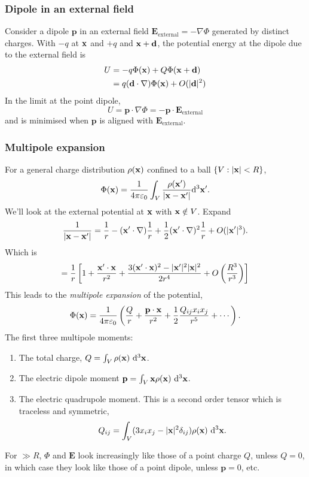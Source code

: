 \documentclass{article}
\begin{document}
\subsubsection{Dipole in an external field}
Consider a dipole $ \mathbf p $ in an external field $ \mathbf E_{\text{external}} = - \nabla\Phi $ generated by distinct charges. With $ -q $ at $ \mathbf{x} $ and $ +q $ and $ \mathbf{x}+\mathbf d $, the potential energy at the dipole due to the external field is
\begin{align*}
	U &= -q\Phi(\mathbf{x}) +Q \Phi(\mathbf{x}+\mathbf d)\\
	  &= q(\mathbf d\cdot\nabla)\Phi(\mathbf{x}) + O(|\mathbf d|^2) \\
\end{align*}
In the limit at the point dipole, 
\[
	U=\mathbf p \cdot\nabla\Phi = -\mathbf p \cdot \mathbf E_{\text{external}}
\]
and is minimised when $ \mathbf p  $ is aligned with $ \mathbf E_{\text{external}} $.
\subsubsection{Multipole expansion}
For a general charge distribution $ \rho(\mathbf{x}) $ confined to a ball $ \{V:|\mathbf{x}|<R\} $,
\[
	\Phi(\mathbf{x}) = \frac 1{4\pi\varepsilon_0}\int_V \frac{\rho(\mathbf{x}')}{|\mathbf{x}-\mathbf{x}'|}\mathrm d^3\mathbf{x}'.
\]
We'll look at the external potential at $ \mathbf{x} $ with $ \mathbf{x}\notin V $. Expand 
\[
	\frac 1{|\mathbf{x}-\mathbf{x}'|}= \frac 1r - (\mathbf{x}'\cdot \nabla)\frac 1r + \frac 12(\mathbf{x}'\cdot \nabla)^2\frac 1r + O(|\mathbf{x}'|^3).
\]
Which is
\[
	=\frac 1r \left[1+\frac {\mathbf{x}'\cdot \mathbf{x}}{r^2} + \frac{3(\mathbf{x}'\cdot\mathbf{x})^2 - |\mathbf{x}'|^2|\mathbf{x}|^2}{2r^4} + O\left(\frac {R^3}{r^3}\right)\right]
\]
This leads to the \textit{multipole expansion} of the potential,
\[
	\Phi(\mathbf{x}) = \frac 1{4\pi \varepsilon_0} \left(\frac Qr + \frac{\mathbf p\cdot\mathbf{x}}{r^2} + \frac 12 \frac{Q_{ij}x_ix_j}{r^5}+\cdots\right).
\]
The first three multipole moments:
\begin{enumerate}
	\item The total charge, $ Q=\int_V \rho(\mathbf x)\  \mathrm d^3 \mathbf{x} $.
	\item The electric dipole moment $ \mathbf p =\int_V \mathbf{x} \rho(\mathbf{x})\ \mathrm d^3 \mathbf{x} $.
	\item The electric quadrupole moment. This is a second order tensor which is traceless and symmetric,
		\[
			Q_{ij} = \int_V (3x_ix_j - |\mathbf{x}|^2 \delta_{ij})\rho (\mathbf{x})\ \mathrm d^3 \mathbf{x}.
		\]
\end{enumerate}
For $ \gg R $, $ \Phi $ and $ \mathbf E $ look increasingly like those of a point charge $ Q $, unless $ Q=0 $, in which case they look like those of a point dipole, unless $ \mathbf p = 0 $, etc.
\end{document}

